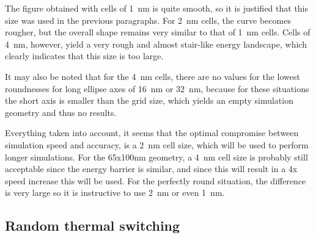 \documentclass[10pt,a4paper]{article}
\begin{document}
The figure obtained with cells of \SI{1}{\nano\metre} is quite smooth, so it is justified that this size was used in the previous paragraphs. For \SI{2}{\nano\metre} cells, the curve becomes rougher, but the overall shape remains very similar to that of \SI{1}{\nano\metre} cells. Cells of \SI{4}{\nano\metre}, however, yield a very rough and almost stair-like energy landscape, which clearly indicates that this size is too large. \par
It may also be noted that for the \SI{4}{\nano\metre} cells, there are no values for the lowest roundnesses for long ellipse axes of \SI{16}{\nano\metre} or \SI{32}{\nano\metre}, because for these situations the short axis is smaller than the grid size, which yields an empty simulation geometry and thus no results. \par
Everything taken into account, it seems that the optimal compromise between simulation speed and accuracy, is a \SI{2}{\nano\metre} cell size, which will be used to perform longer simulations. For the 65x100nm geometry, a \SI{4}{\nano\metre} cell size is probably still acceptable since the energy barrier is similar, and since this will result in a 4x speed increase this will be used. For the perfectly round situation, the difference is very large so it is instructive to use \SI{2}{\nano\metre} or even \SI{1}{\nano\metre}.





\subsection{Random thermal switching}
\end{document}
